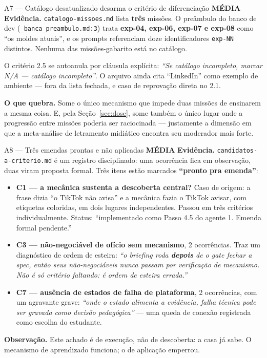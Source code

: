 \documentclass[11pt,a4paper]{article}
\newcommand{\sevmedia}{\textcolor{DarkYellow}{\textbf{M\'EDIA}}}
\begin{document}
\begin{achadobox}{A7 --- Cat\'alogo desatualizado desarma o crit\'erio de diferencia\c{c}\~ao \hfill \sevmedia}
\textbf{Evid\^encia.} \texttt{catalogo-missoes.md} lista \textbf{tr\^es} miss\~oes. O pre\^ambulo
do banco de dev (\texttt{\_banca\_preambulo.md:3}) trata \textbf{exp-04, exp-06, exp-07 e exp-08}
como ``os moldes atuais'', e os prompts referenciam doze identificadores \texttt{exp-NN} distintos.
Nenhuma das miss\~oes-gabarito est\'a no cat\'alogo.

O crit\'erio 2.5 se autoanula por cl\'ausula expl\'icita: \emph{``Se cat\'alogo incompleto, marcar
N/A --- cat\'alogo incompleto''}. O arquivo ainda cita ``LinkedIn'' como exemplo de ambiente ---
fora da lista fechada, e caso de reprova\c{c}\~ao direta no 2.1.

\textbf{O que quebra.} Some o \'unico mecanismo que impede duas miss\~oes de ensinarem a mesma
coisa. E, pela Se\c{c}\~ao~\ref{sec:dose}, some tamb\'em o \'unico lugar onde a progress\~ao entre
miss\~oes poderia ser raciocinada --- justamente a dimens\~ao em que a meta-an\'alise de
letramento midi\'atico encontra seu moderador mais forte.
\end{achadobox}

\begin{achadobox}{A8 --- Tr\^es emendas prontas e n\~ao aplicadas \hfill \sevmedia}
\textbf{Evid\^encia.} \texttt{candidatos-a-criterio.md} \'e um registro disciplinado: uma
ocorr\^encia fica em observa\c{c}\~ao, duas viram proposta formal. Tr\^es itens est\~ao marcados
\textbf{``pronto pra emenda''}:

\begin{itemize}
  \item \textbf{C1 --- a mec\^anica sustenta a descoberta central?} Caso de origem: a frase dizia
        ``o TikTok n\~ao avisa'' e a mec\^anica fazia o TikTok avisar, com etiquetas coloridas, em
        dois lugares independentes. Passou em tr\^es crit\'erios individualmente. Status:
        ``implementado como Passo 4.5 do agente 1. Emenda formal pendente.''
  \item \textbf{C3 --- n\~ao-negoci\'avel de of\'icio sem mecanismo}, 2 ocorr\^encias. Traz um
        diagn\'ostico de ordem de esteira: \emph{``o briefing roda \textbf{depois} de o gate fechar
        a spec, ent\~ao seus n\~ao-negoci\'aveis nunca passam por verifica\c{c}\~ao de mecanismo.
        N\~ao \'e s\'o crit\'erio faltando: \'e ordem de esteira errada.''}
  \item \textbf{C7 --- aus\^encia de estados de falha de plataforma}, 2 ocorr\^encias, com um
        agravante grave: \emph{``onde o estado alimenta a evid\^encia, falha t\'ecnica pode ser
        gravada como decis\~ao pedag\'ogica''} --- uma queda de conex\~ao registrada como escolha
        do estudante.
\end{itemize}

\textbf{Observa\c{c}\~ao.} Este achado \'e de execu\c{c}\~ao, n\~ao de descoberta: a casa j\'a
sabe. O mecanismo de aprendizado funciona; o de aplica\c{c}\~ao emperrou.
\end{achadobox}
\end{document}
